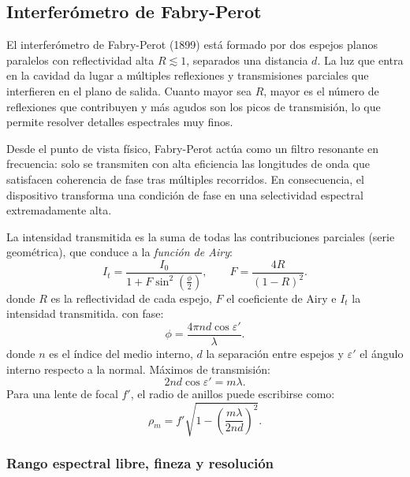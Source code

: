 \documentclass[12pt, a4paper]{article}
\theoremstyle{plain}
\theoremstyle{definition}
\theoremstyle{remark}
\begin{document}
\subsection{Interferómetro de Fabry-Perot}

El interferómetro de Fabry-Perot (1899) está formado por dos espejos planos
paralelos con reflectividad alta $R \lesssim 1$, separados una distancia $d$.
La luz que entra en la cavidad da lugar a múltiples reflexiones y transmisiones
parciales que interfieren en el plano de salida. Cuanto mayor sea $R$, mayor
es el número de reflexiones que contribuyen y más agudos son los picos de
transmisión, lo que permite resolver detalles espectrales muy finos.

Desde el punto de vista físico, Fabry-Perot actúa como un filtro resonante en
frecuencia: solo se transmiten con alta eficiencia las longitudes de onda que
satisfacen coherencia de fase tras múltiples recorridos.
En consecuencia, el dispositivo transforma una condición de fase en una
selectividad espectral extremadamente alta.

La intensidad transmitida es la suma de todas las contribuciones parciales
(serie geométrica), que conduce a la \emph{función de Airy}:
\begin{equation}
  I_t=\frac{I_0}{1+F\sin^2\!\left(\frac{\phi}{2}\right)},
  \qquad
  F=\frac{4R}{(1-R)^2}.
  \label{eq:fabry_airy_t6}
\end{equation}
donde $R$ es la reflectividad de cada espejo, $F$ el coeficiente de Airy e $I_t$ la intensidad transmitida.
con fase:
\begin{equation}
  \phi=\frac{4\pi n d\cos\varepsilon'}{\lambda}.
  \label{eq:fabry_fase_t6}
\end{equation}
donde $n$ es el índice del medio interno, $d$ la separación entre espejos y
$\varepsilon'$ el ángulo interno respecto a la normal.
Máximos de transmisión:
\begin{equation}
  2nd\cos\varepsilon'=m\lambda.
  \label{eq:fabry_max_t6}
\end{equation}
Para una lente de focal $f'$, el radio de anillos puede escribirse como:
\begin{equation}
  \rho_m=f'\sqrt{1-\left(\frac{m\lambda}{2nd}\right)^2}.
  \label{eq:fabry_radio_t6}
\end{equation}

\subsubsection{Rango espectral libre, fineza y resolución}
\end{document}
